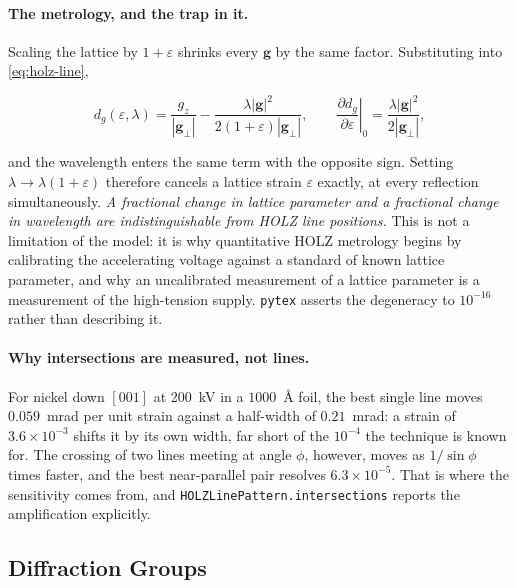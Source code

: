 \paragraph{The metrology, and the trap in it.} Scaling the lattice by \(1+\varepsilon\) shrinks
every \(\mathbf{g}\) by the same factor. Substituting into \eqref{eq:holz-line},

\begin{equation}
  d_{g}(\varepsilon, \lambda) = \frac{g_{z}}{|\mathbf{g}_{\perp}|}
    - \frac{\lambda|\mathbf{g}|^{2}}{2(1+\varepsilon)|\mathbf{g}_{\perp}|},
  \qquad
  \left.\frac{\partial d_{g}}{\partial\varepsilon}\right|_{0}
    = \frac{\lambda|\mathbf{g}|^{2}}{2|\mathbf{g}_{\perp}|},
\end{equation}

and the wavelength enters the same term with the opposite sign. Setting \(\lambda \to
\lambda(1+\varepsilon)\) therefore cancels a lattice strain \(\varepsilon\) exactly, at every
reflection simultaneously. \emph{A fractional change in lattice parameter and a fractional
change in wavelength are indistinguishable from HOLZ line positions.} This is not a limitation
of the model: it is why quantitative HOLZ metrology begins by calibrating the accelerating
voltage against a standard of known lattice parameter, and why an uncalibrated measurement of a
lattice parameter is a measurement of the high-tension supply. \texttt{pytex} asserts the
degeneracy to \(10^{-16}\) rather than describing it.

\paragraph{Why intersections are measured, not lines.} For nickel down \([001]\) at 200~kV in a
\(1000\)~\AA{} foil, the best single line moves \(0.059\)~mrad per unit strain against a
half-width of \(0.21\)~mrad: a strain of \(3.6\times10^{-3}\) shifts it by its own width, far
short of the \(10^{-4}\) the technique is known for. The crossing of two lines meeting at angle
\(\phi\), however, moves as \(1/\sin\phi\) times faster, and the best near-parallel pair
resolves \(6.3\times10^{-5}\). That is where the sensitivity comes from, and
\texttt{HOLZLinePattern.intersections} reports the amplification explicitly.

\subsection{Diffraction Groups}


